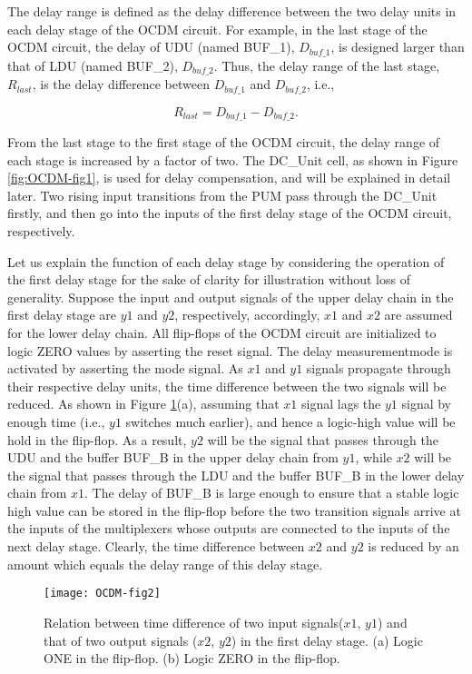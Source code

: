 The delay range is defined as the delay difference between the two delay units in each delay stage of the OCDM circuit. For example, in the last stage of the OCDM circuit, the delay of UDU (named BUF\_1), $D_{buf\_1}$, is designed larger than that of LDU (named BUF\_2), $D_{buf\_2}$. Thus, the delay range of the last stage, $R_{last}$, is the delay difference between $D_{buf\_1}$ and $D_{buf\_2}$, i.e.,

\begin{equation} \label{eq:rlast}
    R_{last} = D_{buf\_1} - D_{buf\_2}.
\end{equation}

From the last stage to the first stage of the OCDM circuit, the delay range of each stage is increased by a factor of two. The DC\_Unit cell, as shown in Figure \ref{fig:OCDM-fig1}, is used for delay compensation, and will be explained in detail later. Two rising input transitions from the PUM pass through the DC\_Unit firstly, and then go into the inputs of the first delay stage of the OCDM circuit, respectively.

Let us explain the function of each delay stage by considering the operation of the first delay stage for the sake of clarity for illustration without loss of generality. Suppose the input and output signals of the upper delay chain in the first delay stage are $y1$ and $y2$, respectively, accordingly, $x1$ and $x2$ are assumed for the lower delay chain. All flip-flops of the OCDM circuit are initialized to logic ZERO values by asserting the reset signal. The delay measurementmode is activated by asserting the mode signal. As $x1$ and $y1$ signals propagate through their respective delay units, the time difference between the two signals will be reduced. As shown in Figure \ref{fig:OCDM-fig2}(a), assuming that $x1$ signal lags the $y1$ signal by enough time (i.e., $y1$ switches much earlier), and hence a logic-high value will be hold in the flip-flop. As a result, $y2$ will be the signal that passes through the UDU and the buffer BUF\_B in the upper delay chain from $y1$, while $x2$ will be the signal that passes through the LDU and the buffer BUF\_B in the lower delay chain from $x1$. The delay of BUF\_B is large enough to ensure that a stable logic high value can be stored in the flip-flop before the two transition signals arrive at the inputs of the multiplexers whose outputs are connected to the inputs of the next delay stage. Clearly, the time difference between $x2$ and $y2$ is reduced by an amount which equals the delay range of this delay stage.
\begin{figure}[t]
\centering
\texttt{[image: OCDM-fig2]}
    \caption{Relation between time difference of two input signals($x1$, $y1$) and that of two output signals ($x2$, $y2$) in the first delay stage. (a) Logic ONE in the flip-flop. (b) Logic ZERO in the flip-flop.}
    \label{fig:OCDM-fig2}
\end{figure}


